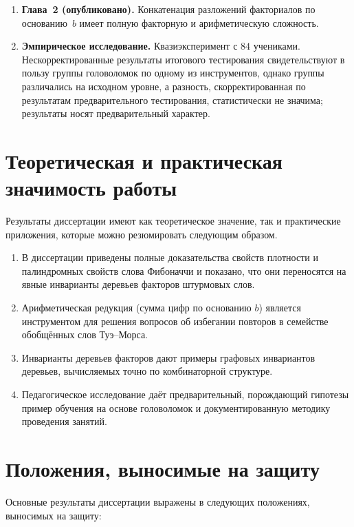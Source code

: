 \documentclass[a4paper,14pt]{extreport}
\theoremstyle{plain}
\theoremstyle{definition}
\theoremstyle{remark}
\begin{document}
\begin{enumerate}
		\item \textbf{Глава~2 (опубликовано).} Конкатенация разложений факториалов по основанию~$b$ имеет полную факторную и арифметическую сложность.
		
		\item \textbf{Эмпирическое исследование.} Квазиэксперимент с $84$ учениками. Нескорректированные результаты итогового тестирования свидетельствуют в пользу группы головоломок по одному из инструментов, однако группы различались на исходном уровне, а разность, скорректированная по результатам предварительного тестирования, статистически не значима; результаты носят предварительный характер.
	\end{enumerate}
	\section*{Теоретическая и практическая значимость работы}
	
	Результаты диссертации имеют как теоретическое значение, так и практические приложения, которые можно резюмировать следующим образом.
	
	\begin{enumerate}
		\item В диссертации приведены полные доказательства свойств плотности и палиндромных свойств слова Фибоначчи и показано, что они переносятся на явные инварианты деревьев факторов штурмовых слов.
		
		\item Арифметическая редукция (сумма цифр по основанию $b$) является инструментом для решения вопросов об избегании повторов в семействе обобщённых слов Туэ--Морса.
		
		\item Инварианты деревьев факторов дают примеры графовых инвариантов деревьев, вычисляемых точно по комбинаторной структуре.
		
		\item Педагогическое исследование даёт предварительный, порождающий гипотезы пример обучения на основе головоломок и документированную методику проведения занятий.
	\end{enumerate}
	\section*{Положения, выносимые на защиту}
	
	Основные результаты диссертации выражены в следующих положениях, выносимых на защиту:
	
\end{document}
